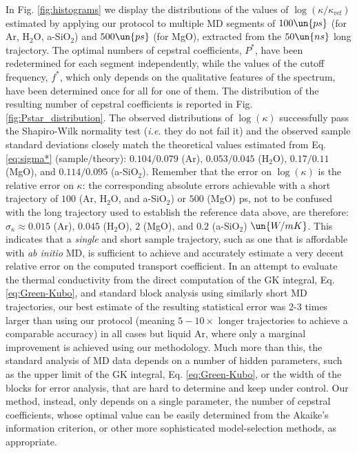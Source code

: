 In Fig. \ref{fig:histograms} we display the distributions of the values of $\log(\kappa/\kappa_{\mathrm{ref}})$ estimated by applying our protocol to multiple MD segments of $100\un{ps}$ (for Ar, H$_2$O, a-SiO$_2$) and $500\un{ps}$ (for MgO), extracted from the $50\un{ns}$ long trajectory. The optimal numbers of cepstral coefficients, $P^*$, have been redetermined for each segment independently, while the values of the cutoff frequency, $f^*$, which only depends on the qualitative features of the spectrum, have been determined once for all for one of them. The distribution of the resulting number of cepstral coefficients is reported in Fig. \ref{fig:Pstar_distribution}. The observed distributions of $\log(\kappa)$ successfully pass the Shapiro-Wilk normality test \cite{Shapiro1965} (\emph{i.e.} they do not fail it) and the observed sample standard deviations closely match the theoretical values estimated from Eq. \eqref{eq:sigma*} (sample/theory):  $0.104/0.079$ (Ar), $0.053/0.045$ (H$_2$O), $0.17/0.11$ (MgO), and $0.114/0.095$ (a-SiO$_2$). Remember that the error on $\log(\kappa)$ is the relative error on $\kappa$: the corresponding absolute errors achievable with a short trajectory of $100$ (Ar, H$_2$O, and a-SiO$_2$) or $500$ (MgO) ps, not to be confused with the long trajectory used to establish the reference data above, are therefore: $\sigma_\kappa \approx 0.015$ (Ar), $0.045$ (H$_2$O), $2$ (MgO), and $0.2$ (a-SiO$_2$) $\un{W/mK}$. This indicates that a \emph{single} and short sample trajectory, such as one that is affordable with \emph{ab initio} MD, is sufficient to achieve and accurately estimate a very decent relative error on the computed transport coefficient. In an attempt to evaluate the thermal conductivity from the direct computation of the GK integral, Eq. \eqref{eq:Green-Kubo}, and standard block analysis using similarly short MD trajectories, our best estimate of the resulting statistical error was 2-3 times larger than using our protocol (meaning $5-10\times$ longer trajectories to achieve a comparable accuracy) in all cases but liquid Ar, where only a marginal improvement is achieved using our methodology. Much more than this, the standard analysis of MD data depends on a number of hidden parameters, such as the upper limit of the GK integral, Eq. \eqref{eq:Green-Kubo}, or the width of the blocks for error analysis, that are hard to determine and keep under control. Our method, instead, only depends on a single parameter, the number of cepstral coefficients, whose optimal value can be easily determined from the Akaike's information criterion, or other more sophisticated model-selection methods,\cite{Burnham2004,Claeskens2008} as appropriate.

